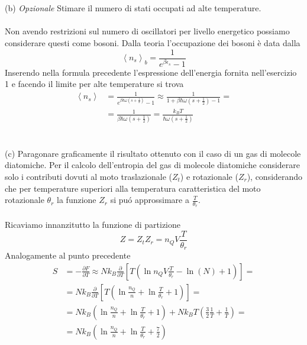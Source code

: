 \documentclass[a4paper]{article}
\begin{document}
        \\
        \\
        (b) \emph{Opzionale} Stimare il numero di stati occupati ad alte temperature.
        \\
        \\
        Non avendo restrizioni sul numero di oscillatori per livello energetico possiamo considerare questi come bosoni.
        Dalla teoria l'occupazione dei bosoni è data dalla
        \begin{equation*}
            \left\langle n_s \right\rangle_b=\frac{1}{e^{\beta\epsilon_s}-1}
        \end{equation*}
        Inserendo nella formula precedente l'espressione dell'energia fornita nell'esercizio 1 e facendo il limite per alte temperature si trova
        \begin{equation*}
            \begin{split}
                \left\langle n_s \right\rangle&=\frac{1}{e^{\beta\hbar\omega\left(s+\frac{1}{2}\right)}-1}\approx\frac{1}{1+\beta\hbar\omega\left(s+\frac{1}{2}\right)-1}=\\
                &=\frac{1}{\beta\hbar\omega\left(s+\frac{1}{2}\right)}=\frac{k_BT}{\hbar\omega\left(s+\frac{1}{2}\right)}
            \end{split}
        \end{equation*}
        \\
        \\
        (c) Paragonare graficamente il risultato ottenuto con il caso di un gas di molecole diatomiche.
        Per il calcolo dell'entropia del gas di molecole diatomiche considerare solo i contributi dovuti al moto traslazionale ($Z_t$) e rotazionale ($Z_r$), considerando che per temperature superiori alla temperatura caratteristica del moto rotazionale $\theta_r$ la funzione $Z_r$ si puó approssimare a $\frac{T}{\theta_r}$.
        \\
        \\
        Ricaviamo innanzitutto la funzione di partizione
        \begin{equation*}
            Z=Z_tZ_r=n_QV\frac{T}{\theta_r}
        \end{equation*}
        Analogamente al punto precedente
        \begin{equation*}
            \begin{split}
                S&=-\frac{\partial F}{\partial T}\approx Nk_B\frac{\partial}{\partial T}\left[T\left(\ln n_QV\frac{T}{\theta_r}-\ln(N) +1\right)\right]=\\
                &=Nk_B\frac{\partial}{\partial T}\left[T\left(\ln\frac{n_Q}{n}+\ln\frac{T}{\theta_r}+1\right)\right]=\\
                &=Nk_B\left(\ln\frac{n_Q}{n}+\ln\frac{T}{\theta_r}+1\right)+Nk_BT\left(\frac{3}{2}\frac{1}{T}+\frac{1}{T}\right)=\\
                &=Nk_B\left(\ln\frac{n_Q}{n}+\ln\frac{T}{\theta_r}+\frac{7}{2}\right)
            \end{split}
        \end{equation*}
\end{document}
